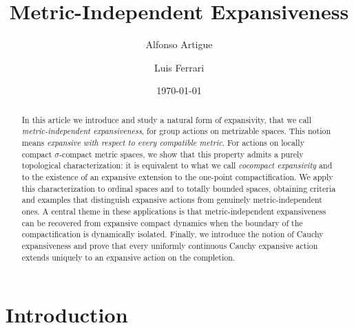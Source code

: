\documentclass[12pt]{amsart}
\theoremstyle{plain}
\theoremstyle{definition}
\theoremstyle{remark}
\begin{document}
\author[A. Artigue]{Alfonso Artigue}
\address{Departamento de Matemática y Estadística del Litoral\\
Centro Universitario Regional Litoral Norte\\
Universidad de la Rep\'ublica\\
Florida 1065, Paysandú, Uruguay.\\}

\author[L. Ferrari]{Luis Ferrari}
\address{Departamento de Matem\'atica y Aplicaciones\\
Universidad de la Rep\'ublica\\
Maldonado, Tacuaremb\'o entre Av. Artigas y Aparicio Saravia, CP 20000, Uruguay}


\title{Metric-Independent Expansiveness}
\date{\today}


\begin{abstract}
In this article we introduce and study a natural form of expansivity, that we call \textit{metric-independent expansiveness}, for group actions on metrizable spaces. This notion means \textit{expansive with respect to every compatible metric}. For actions on locally compact $\sigma$-compact metric spaces, we show that this property admits a purely topological characterization: it is equivalent to what we call \textit{cocompact expansivity} and to the existence of an expansive extension to the one-point compactification.
We apply this characterization to ordinal spaces and to totally bounded spaces, obtaining criteria and examples that distinguish expansive actions from genuinely metric-independent ones.
A central theme in these applications is that metric-independent expansiveness can be recovered from expansive compact dynamics when the boundary of the compactification is dynamically isolated. Finally, we introduce the notion of Cauchy expansiveness and prove that every uniformly continuous Cauchy expansive action extends uniquely to an expansive action on the completion.
\end{abstract}

\maketitle


\section{Introduction}
\end{document}
